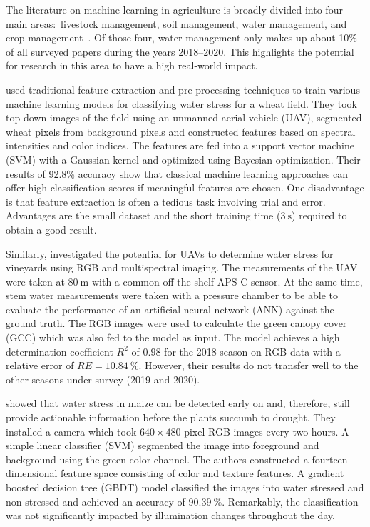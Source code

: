 \documentclass[draft,final]{vutinfth} %
\begin{document}
The literature on machine learning in agriculture is broadly divided
into four main areas:~livestock management, soil management, water
management, and crop management~\cite{benos2021}. Of those four, water
management only makes up about 10\% of all surveyed papers during the
years 2018--2020. This highlights the potential for research in this
area to have a high real-world impact.

\textcite{su2020} used traditional feature extraction and
pre-processing techniques to train various machine learning models for
classifying water stress for a wheat field. They took top-down images
of the field using an unmanned aerial vehicle (UAV), segmented wheat
pixels from background pixels and constructed features based on
spectral intensities and color indices. The features are fed into a
support vector machine (SVM) with a Gaussian kernel and optimized
using Bayesian optimization. Their results of 92.8\% accuracy show
that classical machine learning approaches can offer high
classification scores if meaningful features are chosen. One
disadvantage is that feature extraction is often a tedious task
involving trial and error. Advantages are the small dataset and the
short training time ($\qty{3}{\second}$) required to obtain a good
result.

Similarly, \textcite{lopez-garcia2022} investigated the potential for
UAVs to determine water stress for vineyards using RGB and
multispectral imaging. The measurements of the UAV were taken at
$\qty{80}{\meter}$ with a common off-the-shelf APS-C sensor. At the
same time, stem water measurements were taken with a pressure chamber
to be able to evaluate the performance of an artificial neural network
(ANN) against the ground truth. The RGB images were used to calculate
the green canopy cover (GCC) which was also fed to the model as
input. The model achieves a high determination coefficient $R^{2}$ of
$0.98$ for the 2018 season on RGB data with a relative error of
$RE = \qty{10.84}{\percent}$. However, their results do not transfer
well to the other seasons under survey (2019 and 2020).

\textcite{zhuang2017} showed that water stress in maize can be
detected early on and, therefore, still provide actionable information
before the plants succumb to drought. They installed a camera which
took $640\times480$ pixel RGB images every two hours. A simple linear
classifier (SVM) segmented the image into foreground and background
using the green color channel. The authors constructed a
fourteen-dimensional feature space consisting of color and texture
features. A gradient boosted decision tree (GBDT) model classified the
images into water stressed and non-stressed and achieved an accuracy
of $\qty{90.39}{\percent}$. Remarkably, the classification was not
significantly impacted by illumination changes throughout the day.
\end{document}
